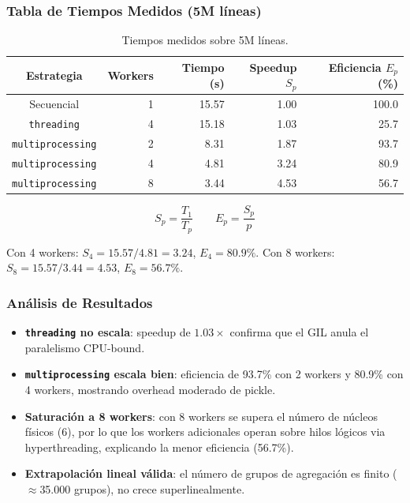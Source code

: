 \documentclass[10pt,a4paper]{article}
\begin{document}
\subsubsection{Tabla de Tiempos Medidos (5M l\'ineas)}

\begin{table}[H]
\centering
\begin{tabular}{crrrr}
\toprule
\textbf{Estrategia} & \textbf{Workers} & \textbf{Tiempo (s)} & \textbf{Speedup $S_p$} & \textbf{Eficiencia $E_p$ (\%)} \\
\midrule
Secuencial               & 1 & 15.57 & 1.00 & 100.0 \\
\texttt{threading}       & 4 & 15.18 & 1.03 & 25.7  \\
\texttt{multiprocessing} & 2 & 8.31  & 1.87 & 93.7  \\
\texttt{multiprocessing} & 4 & 4.81  & 3.24 & 80.9  \\
\texttt{multiprocessing} & 8 & 3.44  & 4.53 & 56.7  \\
\bottomrule
\end{tabular}
\caption{Tiempos medidos sobre 5M l\'ineas.}
\end{table}
\[
S_p = \frac{T_1}{T_p} \qquad E_p = \frac{S_p}{p}
\]

Con 4 workers: $S_4 = 15.57/4.81 = 3.24$, $E_4 = 80.9\%$. \quad
Con 8 workers: $S_8 = 15.57/3.44 = 4.53$, $E_8 = 56.7\%$.

\subsubsection{An\'alisis de Resultados}

\begin{itemize}
    \item \textbf{\texttt{threading} no escala}: speedup de $1.03\times$
        confirma que el GIL anula el paralelismo CPU-bound.
    \item \textbf{\texttt{multiprocessing} escala bien}: eficiencia de 93.7\%
        con 2 workers y 80.9\% con 4 workers, mostrando overhead moderado
        de pickle.
    \item \textbf{Saturaci\'on a 8 workers}: con 8 workers se supera el
        n\'umero de n\'ucleos f\'isicos (6), por lo que los workers
        adicionales operan sobre hilos l\'ogicos via hyperthreading,
        explicando la menor eficiencia (56.7\%).
    \item \textbf{Extrapolaci\'on lineal v\'alida}: el n\'umero de grupos de
        agregaci\'on es finito ($\approx$35.000 grupos), no crece
        superlinealmente.
\end{itemize}
\end{document}
